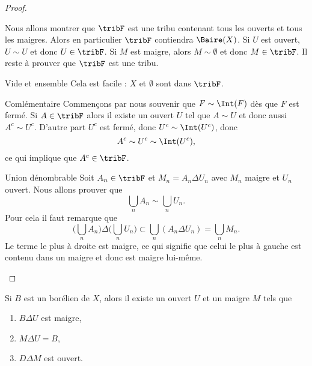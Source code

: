 \begin{proof}
\begin{subproof}
            Nous allons montrer que \( \tribF\) est une tribu contenant tous les ouverts et tous les maigres. Alors en particulier \( \tribF\) contiendra \( \Baire(X)\). Si \( U\) est ouvert, \( U\sim U\) et donc \( U\in\tribF\). Si \( M \) est maigre, alors \( M\sim\emptyset\) et donc \( M\in\tribF\). Il reste à prouver que \( \tribF\) est une tribu.
            \begin{subproof}
            \item[Vide et ensemble] Cela est facile : \( X\) et \( \emptyset\) sont dans \( \tribF\).
            \item[Comlémentaire] Commençons par nous souvenir que \( F\sim\Int(F)\) dès que \( F\) est fermé. Si \( A\in\tribF\) alors il existe un ouvert \( U\) tel que \( A\sim U\) et donc aussi \( A^c\sim U^c\). D'autre part \( U^c\) est fermé, donc \( U^c\sim\Int(U^c)\), donc
                \begin{equation}
                    A^c\sim U^c\sim\Int(U^c),
                \end{equation}
                ce qui implique que \( A^c\in\tribF\).
            \item[Union dénombrable] Soit \( A_n\in\tribF\) et \( M_n=A_n\Delta U_n\) avec \( M_n\) maigre et \( U_n\) ouvert. Nous allons prouver que
                \begin{equation}
                    \bigcup_nA_n\sim\bigcup_nU_n.
                \end{equation}
                Pour cela il faut remarque que
                \begin{equation}
                    \Big( \bigcup_nA_n \Big)\Delta\Big( \bigcup_nU_n \Big)\subset\bigcup_n(A_n\Delta U_n)=\bigcup_nM_n.
                \end{equation}
                Le terme le plus à droite est maigre, ce qui signifie que celui le plus à gauche est contenu dans un maigre et donc est maigre lui-même.
            \end{subproof}
    \end{subproof}
\end{proof}

\begin{proposition}
    Si \( B\) est un borélien de \( X\), alors il existe un ouvert \( U\) et un maigre \( M\) tels que
    \begin{enumerate}
        \item
            \( B\Delta U\) est maigre,
        \item
            \( M\Delta U=B\),
        \item
            \( D\Delta M\) est ouvert.
    \end{enumerate}
\end{proposition}


